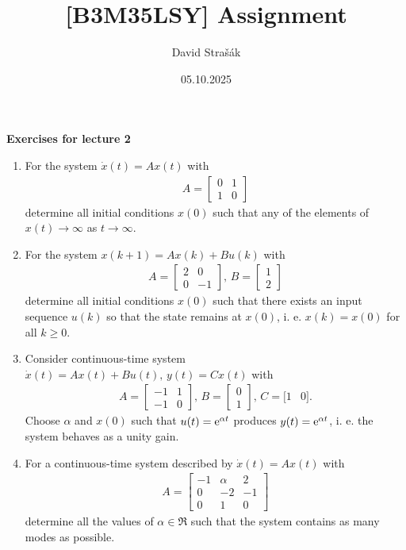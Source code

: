 \documentclass[10pt]{article} %
\title{[B3M35LSY] Assignment}
\author{David Strašák}
\date{05.10.2025} %
\begin{document}

{\bf Exercises for lecture 2}

\begin{enumerate}
\item For the system $\dot{x}(t) = Ax(t)$ with
\begin{eqnarray*}
A=\begin{bmatrix}
0 & 1\\
1 & 0 
\end{bmatrix}
\end{eqnarray*}
determine all initial conditions $x(0)$ such that any of the elements of $x(t) \rightarrow \infty$ as $t \rightarrow \infty$.

\item For the system $x(k+1) = Ax(k) + Bu(k)$ with 
\begin{eqnarray*}
A=\begin{bmatrix}
2 & 0\\
0 & -1
\end{bmatrix},\,
B=\begin{bmatrix}
1\\
2
\end{bmatrix}
\end{eqnarray*}
determine all initial conditions $x(0)$ such that there exists an input sequence $u(k)$ so that the state remains  at $x(0)$, i. e. $x(k) = x(0)$ for all $k \geq 0$.

\item Consider continuous-time system $\dot{x}(t) = Ax(t) + Bu(t),\,y(t) = Cx(t)$ with 
\begin{eqnarray*}
A=\begin{bmatrix}
-1 & 1\\
-1 & 0
\end{bmatrix},\,
B=\begin{bmatrix}
0\\
1
\end{bmatrix},\,
C = [1 & 0].
\end{eqnarray*}
Choose $\alpha$ and $x(0)$ such that $u(t)={\rm e}^{\alpha t}$ produces $y(t) = {\rm e}^{\alpha t}$, i. e. the system behaves as a unity gain.

\item For a continuous-time system described by
$\dot{x}(t) = Ax(t)$ with
\begin{eqnarray*}
A=\begin{bmatrix}
-1 & \alpha & 2\\
0 & -2 & -1\\
0 & 1 & 0
\end{bmatrix}
\end{eqnarray*}
determine all the values of $\alpha \in \Re$ such that the system
contains as many modes as possible.


\end{enumerate}
\end{document}
